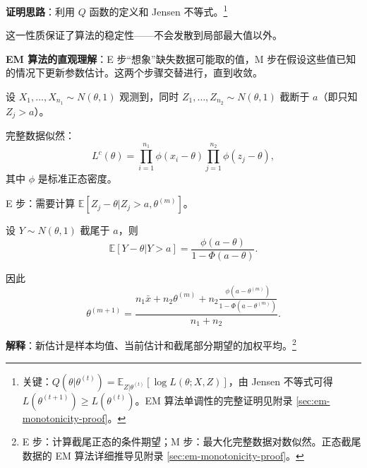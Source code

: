 \textbf{证明思路}：利用 $Q$ 函数的定义和 Jensen 不等式。\footnote{关键：$Q(\theta|\theta^{(t)}) = \mathbb{E}_{Z|\theta^{(t)}}[\log L(\theta;X,Z)]$，由 Jensen 不等式可得 $L(\theta^{(t+1)}) \geq L(\theta^{(t)})$。EM 算法单调性的完整证明见附录 \cref{sec:em-monotonicity-proof}。}

这一性质保证了算法的稳定性——不会发散到局部最大值以外。

\begin{remark}
\textbf{EM 算法的直观理解}：E 步``想象''缺失数据可能取的值，M 步在假设这些值已知的情况下更新参数估计。这两个步骤交替进行，直到收敛。
\end{remark}

\begin{example}\label{ex:em-normal-missing}
设 $X_1, \ldots, X_{n_1} \sim N(\theta, 1)$ 观测到，同时 $Z_1, \ldots, Z_{n_2} \sim N(\theta, 1)$ 截断于 $a$（即只知 $Z_j > a$）。

完整数据似然：
\[
L^c(\theta) = \prod_{i=1}^{n_1} \phi(x_i - \theta) \prod_{j=1}^{n_2} \phi(z_j - \theta),
\]
其中 $\phi$ 是标准正态密度。

E 步：需要计算 $\mathbb{E}[Z_j - \theta | Z_j > a, \theta^{(m)}]$。

设 $Y \sim N(\theta, 1)$ 截尾于 $a$，则
\[
\mathbb{E}[Y - \theta | Y > a] = \frac{\phi(a-\theta)}{1-\Phi(a-\theta)}.
\]

因此
\[
\theta^{(m+1)} = \frac{n_1\bar{x} + n_2\theta^{(m)} + n_2\frac{\phi(a-\theta^{(m)})}{1-\Phi(a-\theta^{(m)})}}{n_1+n_2}.
\label{eq:em-normal-missing-update}
\]

\textbf{解释}：新估计是样本均值、当前估计和截尾部分期望的加权平均。\footnote{E 步：计算截尾正态的条件期望；M 步：最大化完整数据对数似然。正态截尾数据的 EM 算法详细推导见附录 \cref{sec:em-monotonicity-proof}。}
\end{example}

